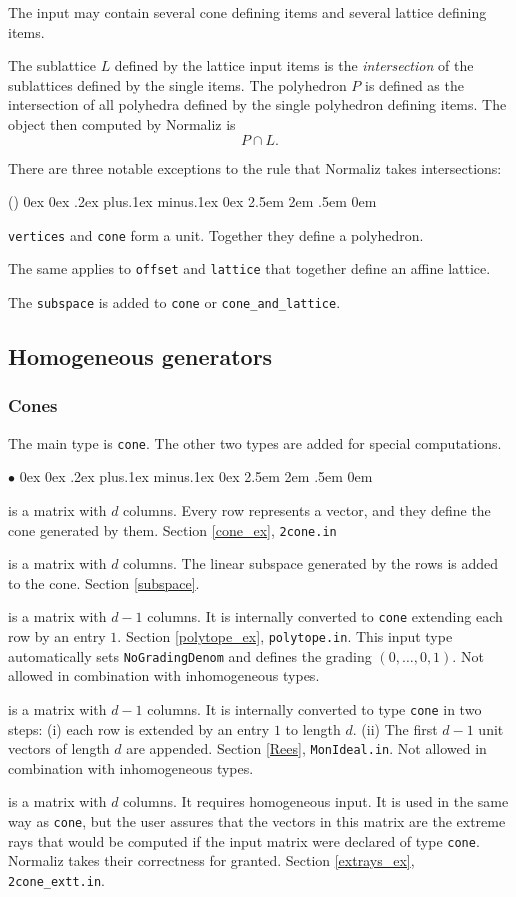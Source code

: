 \documentclass[12pt,a4paper]{scrartcl}
\newcounter{listi}
\newcommand{\stdli}{ \topsep0ex \partopsep0ex %
\parsep.2ex plus.1ex minus.1ex \itemsep0ex%
\leftmargin2.5em \labelwidth2em \labelsep.5em \rightmargin0em}%
\newenvironment{arab}{\begin{list}{\textup{(\arabic{listi})}}%
	{\usecounter{listi}\stdli}}{\end{list}}
\renewenvironment{itemize}{\begin{list}{{$\bullet$}}{\stdli}}{\end{list}}
\theoremstyle{definition}
\def\itemtt[#1]{\item[\textbf{\ttt{#1}}]}
\def\ttt{\texttt}
\begin{document}
The input may contain several cone defining items and several lattice defining items.

The sublattice $L$  defined by the lattice input items is the \emph{intersection} of the sublattices defined by the single items. The polyhedron $P$ is defined as the intersection of all polyhedra defined by the single  polyhedron defining items. The object then computed by Normaliz is
$$
P\cap L.
$$

There are three notable exceptions to the rule that Normaliz takes intersections:
\begin{arab}
	\item \verb|vertices| and \verb|cone| form a unit. Together they define a polyhedron.
	\item The same applies to \verb|offset| and \verb|lattice| that together define an affine lattice.
	\item The \verb|subspace| is added to \verb|cone| or \verb|cone_and_lattice|.
\end{arab}

\subsection{Homogeneous generators}

\subsubsection{Cones}\label{cone_synt}

The main type is \verb|cone|. The other two types are added for special computations.

\begin{itemize}
	\itemtt[cone] is a matrix with $d$ columns. Every row represents a vector, and they define the cone generated by them. Section \ref{cone_ex}, \verb|2cone.in|

	\itemtt[subspace] is a matrix with $d$ columns. The linear subspace generated by the rows is added to the cone. Section \ref{subspace}.
	
	\itemtt[polytope] is a matrix with $d-1$ columns. It is internally converted to \verb|cone| extending each row by an entry $1$.  Section \ref{polytope_ex}, \verb|polytope.in|. This input type automatically sets \verb|NoGradingDenom| and defines the grading $(0,\dots,0,1)$. Not allowed in combination with inhomogeneous types.
	
	\itemtt[rees\_algebra] is a matrix with $d-1$ columns. It is internally converted to type \verb|cone| in two steps: (i) each row is extended by an entry $1$ to length $d$. (ii) The first $d-1$ unit vectors of length $d$ are appended. Section \ref{Rees}, \verb|MonIdeal.in|. Not allowed in combination with inhomogeneous types.
	
	\itemtt[extreme\_rays] is a matrix with $d$ columns. It requires homogeneous input. It is used in the same way as \ttt{cone}, but the user assures that the vectors in this matrix are the extreme rays that would be computed if the input matrix were declared of type \ttt{cone}.  Normaliz takes their correctness for granted. Section \ref{extrays_ex}, \verb|2cone_extt.in|.
\end{itemize}
\end{document}
